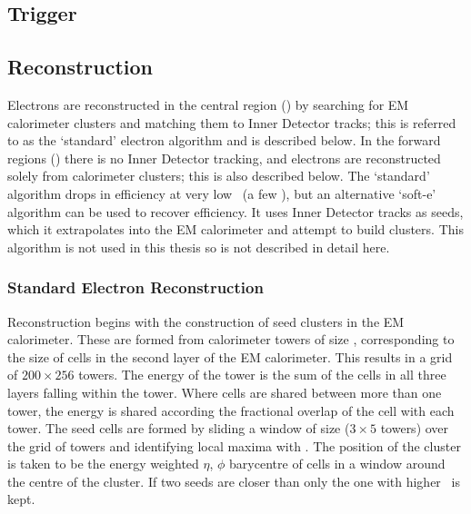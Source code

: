 \subsection{Trigger}
\label{sec:reco-el-triggers}

\subsection{Reconstruction}

Electrons are reconstructed in the central region () by searching
for EM calorimeter clusters and matching them to Inner Detector tracks; this is
referred to as the `standard' electron algorithm and is described below.
In the forward regions () there is no Inner Detector
tracking, and electrons are reconstructed solely from calorimeter clusters; this
is also described below. The `standard' algorithm drops in efficiency at very
low \pt\
(a few \gev), but an alternative `soft-e' algorithm can be used to recover
efficiency. It uses Inner Detector tracks as seeds, which it extrapolates into
the EM calorimeter and attempt to build clusters. This algorithm is not used in
this thesis so is not described in detail here.

\subsubsection{Standard Electron Reconstruction}

Reconstruction begins
with the construction of seed clusters in the EM calorimeter. These are formed from
calorimeter towers of size \deltaetadeltaphi{0.025}{0.025}, corresponding to the
size of cells in the second layer of the EM calorimeter. This
results in a grid of $200 \times 256$ towers. The energy
of the tower is the sum of the cells in all three layers
falling within the tower. Where cells are shared between more than one tower, the
energy is shared according the fractional overlap of the cell with each
tower. The seed cells are formed by sliding a
window of size  ($3 \times 5$ towers) over the
grid of towers and identifying local maxima with \etgt{2.5}. The position
of the cluster is taken to be the energy weighted $\eta$, $\phi$ barycentre of
cells in a window around the centre of the cluster. If two seeds are closer than
\deltaetadeltaphi{0.050}{0.050} only the one with higher \et\ is kept.

